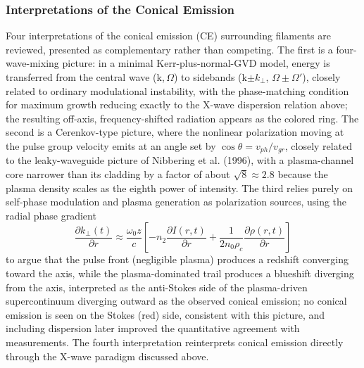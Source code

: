 \documentclass[11pt,a4paper]{article}
\begin{document}
\subsubsection{Interpretations of the Conical Emission}
Four interpretations of the conical emission (CE) surrounding filaments are reviewed, presented as complementary rather than competing. The first is a four-wave-mixing picture: in a minimal Kerr-plus-normal-GVD model, energy is transferred from the central wave (k,\,$\Omega$) to sidebands (k$\pm k_\perp$, $\Omega\pm\Omega'$), closely related to ordinary modulational instability, with the phase-matching condition for maximum growth reducing exactly to the X-wave dispersion relation above; the resulting off-axis, frequency-shifted radiation appears as the colored ring. The second is a Cerenkov-type picture, where the nonlinear polarization moving at the pulse group velocity emits at an angle set by $\cos\theta=v_{ph}/v_{gr}$, closely related to the leaky-waveguide picture of Nibbering et al. (1996), with a plasma-channel core narrower than its cladding by a factor of about $\sqrt{8}\approx2.8$ because the plasma density scales as the eighth power of intensity. The third relies purely on self-phase modulation and plasma generation as polarization sources, using the radial phase gradient
\begin{equation}
\frac{\partial k_\perp(t)}{\partial r} \approx \frac{\omega_0 z}{c}\left[-n_2\frac{\partial I(r,t)}{\partial r} + \frac{1}{2n_0\rho_c}\frac{\partial\rho(r,t)}{\partial r}\right]
\end{equation}
to argue that the pulse front (negligible plasma) produces a redshift converging toward the axis, while the plasma-dominated trail produces a blueshift diverging from the axis, interpreted as the anti-Stokes side of the plasma-driven supercontinuum diverging outward as the observed conical emission; no conical emission is seen on the Stokes (red) side, consistent with this picture, and including dispersion later improved the quantitative agreement with measurements. The fourth interpretation reinterprets conical emission directly through the X-wave paradigm discussed above.
\end{document}
